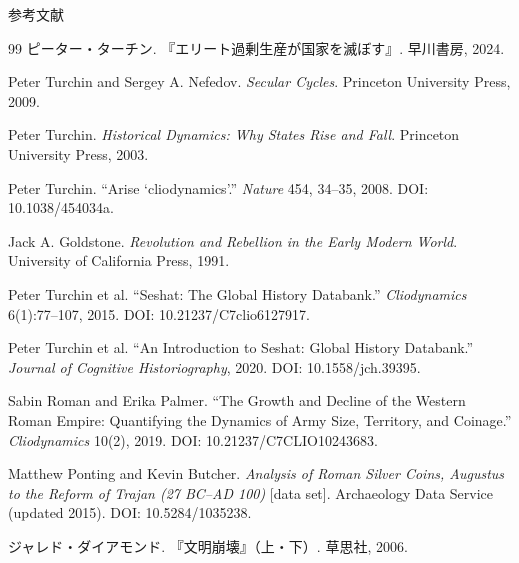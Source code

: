 \documentclass[aspectratio=169,11pt]{beamer}
\begin{document}
\begin{frame}{参考文献}
  \begin{thebibliography}{99}
      ピーター・ターチン.
      \newblock 『エリート過剰生産が国家を滅ぼす』.
      \newblock 早川書房, 2024.

      Peter Turchin and Sergey A. Nefedov.
      \newblock \emph{Secular Cycles}.
      \newblock Princeton University Press, 2009.

      Peter Turchin.
      \newblock \emph{Historical Dynamics: Why States Rise and Fall}.
      \newblock Princeton University Press, 2003.

      Peter Turchin.
      \newblock ``Arise `cliodynamics'.''
      \newblock \emph{Nature} 454, 34--35, 2008.
      \newblock DOI: 10.1038/454034a.

      Jack A. Goldstone.
      \newblock \emph{Revolution and Rebellion in the Early Modern World}.
      \newblock University of California Press, 1991.

      Peter Turchin et al.
      \newblock ``Seshat: The Global History Databank.''
      \newblock \emph{Cliodynamics} 6(1):77--107, 2015.
      \newblock DOI: 10.21237/C7clio6127917.

      Peter Turchin et al.
      \newblock ``An Introduction to Seshat: Global History Databank.''
      \newblock \emph{Journal of Cognitive Historiography}, 2020.
      \newblock DOI: 10.1558/jch.39395.

      Sabin Roman and Erika Palmer.
      \newblock ``The Growth and Decline of the Western Roman Empire: Quantifying the Dynamics of Army Size, Territory, and Coinage.''
      \newblock \emph{Cliodynamics} 10(2), 2019.
      \newblock DOI: 10.21237/C7CLIO10243683.

      Matthew Ponting and Kevin Butcher.
      \newblock \emph{Analysis of Roman Silver Coins, Augustus to the Reform of Trajan (27 BC--AD 100)} [data set].
      \newblock Archaeology Data Service (updated 2015).
      \newblock DOI: 10.5284/1035238.

      ジャレド・ダイアモンド.
      \newblock 『文明崩壊』（上・下）.
      \newblock 草思社, 2006.
  \end{thebibliography}
\end{frame}
\end{document}
